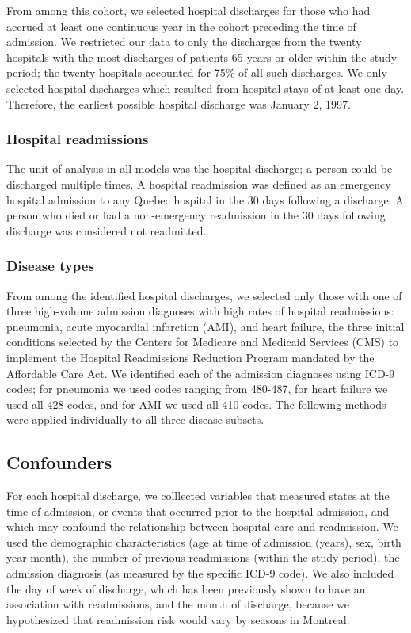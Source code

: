 \documentclass[]{article}\usepackage[]{graphicx}\usepackage[]{color}
\begin{document}
From among this cohort, we selected hospital discharges for those who had accrued at least one continuous year in the cohort preceding the time of admission. We restricted our data to only the discharges from the twenty hospitals with the most discharges of patients 65 years or older within the study period; the twenty hospitals accounted for 75\% of all such discharges.  We only selected hospital discharges which resulted from hospital stays of at least one day. Therefore, the earliest possible hospital discharge was January 2, 1997.

\subsubsection{Hospital readmissions}
The unit of analysis in all models was the hospital discharge; a person could be discharged multiple times. A hospital readmission was defined as an emergency hospital admission to any Quebec hospital in the 30 days following a discharge.  A person who died or had a non-emergency readmission in the 30 days following discharge was considered not readmitted.

\subsubsection{Disease types}
From among the identified hospital discharges, we selected only those with one of three high-volume admission diagnoses with high rates of hospital readmissions: pneumonia, acute myocardial infarction (AMI), and heart failure, the three initial conditions selected by the Centers for Medicare and Medicaid Services (CMS) to implement the Hospital Readmissions Reduction Program mandated by the Affordable Care Act. We identified each of the admission diagnoses using ICD-9 codes; for pneumonia we used codes ranging from 480-487, for heart failure we used all 428 codes, and for AMI we used all 410 codes. The following methods were applied individually to all three disease subsets. 




\subsection{Confounders}
For each hospital discharge, we colllected variables that measured states at the time of admission, or events that occurred prior to the hospital admission, and which may confound the relationship between hospital care and readmission. We used the demographic characteristics (age at time of admission (years), sex, birth year-month), the number of previous readmissions (within the study period), the admission diagnosis (as measured by the specific ICD-9 code). We also included the day of week of discharge, which has been previously shown to have an association with readmissions, and the month of discharge, because we hypothesized that readmission risk would vary by seasons in Montreal.
\end{document}

